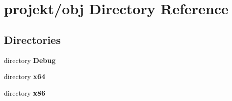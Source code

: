 \section{projekt/obj Directory Reference}
\label{dir_2079315c963846a8c448798f12155667}
\subsection*{Directories}
\begin{DoxyCompactItemize}
\item 
directory \textbf{ Debug}
\item 
directory \textbf{ x64}
\item 
directory \textbf{ x86}
\end{DoxyCompactItemize}
